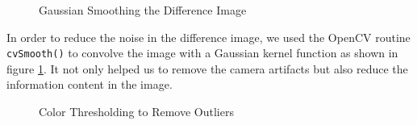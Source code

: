 \begin{figure}[ht!]
\centering
{} \quad
{} \hfill
\caption{Gaussian Smoothing the Difference Image}
\label{figure:gauss}
\end{figure}

In order to reduce the noise in the difference image, we used the OpenCV routine \texttt{cvSmooth()} to convolve the image with a Gaussian kernel function as shown in figure \ref{figure:gauss}. It not only helped us to remove the camera artifacts but also reduce the information content in the image.

\begin{figure}[ht!]
\centering
{} \quad
{} \hfill
\caption{Color Thresholding to Remove Outliers}
\label{figure:color-thres}
\end{figure}


